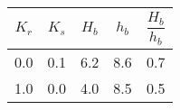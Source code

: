 \begin{tabular}{ccccc}
$K_{r}$ & $K_{s}$ & $H_{b}$ & $h_{b}$ & $\dfrac{H_{b}}{h_{b}}$ \\
\hline
0.0 & 0.1 & 6.2 & 8.6 & 0.7 \\
1.0 & 0.0 & 4.0 & 8.5 & 0.5 \\
\hline
\end{tabular}
